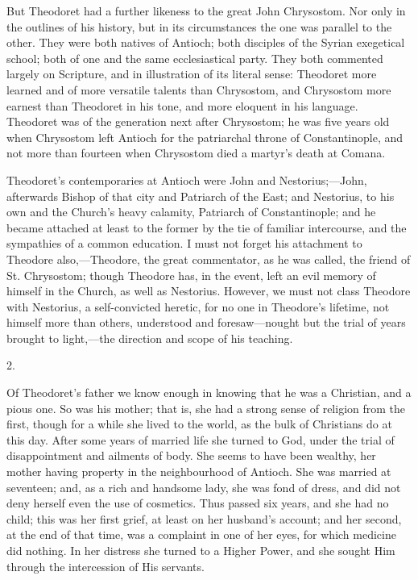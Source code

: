 But Theodoret had a further likeness to the great John Chrysostom.
Nor only in the outlines of his history, but in its circumstances the
one was parallel to the other. They were both natives of Antioch; both
disciples of the Syrian exegetical school; both of one and the same
ecclesiastical party. They both commented largely on Scripture, and in
illustration of its literal sense: Theodoret more learned and of more
versatile talents than Chrysostom, and Chrysostom more earnest than
Theodoret in his tone, and more eloquent in his language. Theodoret
was of the generation next after Chrysostom; he was five years old
when Chrysostom left Antioch for the patriarchal throne of
Constantinople, and not more than fourteen when Chrysostom died a
martyr's death at Comana.

Theodoret's contemporaries at Antioch were John and Nestorius;—John,
afterwards Bishop of that city and Patriarch of the East; and
Nestorius, to his own and the Church's heavy calamity, Patriarch of
Constantinople; and he became attached at least to the former by the
tie of familiar intercourse, and the sympathies of a common education.
I must not forget his attachment to Theodore also,—Theodore, the
great commentator, as he was called, the friend of St. Chrysostom;
though Theodore has, in the event, left an evil memory of himself in
the Church, as well as Nestorius. However, we must not class Theodore
with Nestorius, a self-convicted heretic, for no one in Theodore's
lifetime, not himself more than others, understood and foresaw—nought
but the trial of years brought to light,—the direction and
scope of his teaching.

2.

Of Theodoret's father we know enough in knowing that he was a
Christian, and a pious one. So was his mother; that is, she had a
strong sense of religion from the first, though for a while she lived
to the world, as the bulk of Christians do at this day. After some
years of married life she turned to God, under the trial of
disappointment and ailments of body. She seems to have been wealthy,
her mother having property in the neighbourhood of Antioch. She was
married at seventeen; and, as a rich and handsome lady, she was fond
of dress, and did not deny herself even the use of cosmetics. Thus
passed six years, and she had no child; this was her first grief, at
least on her husband's account; and her second, at the end of that
time, was a complaint in one of her eyes, for which medicine did
nothing. In her distress she turned to a Higher Power, and she sought
Him through the intercession of His servants.

